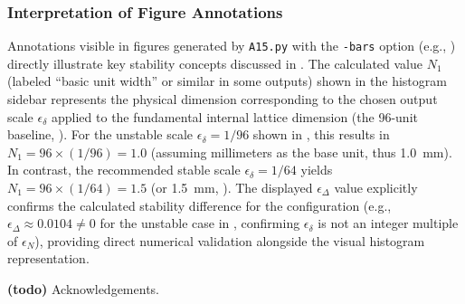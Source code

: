 \documentclass[10pt]{article}
\begin{document}
\subsubsection{Interpretation of Figure Annotations}\label{subsubsec-notes-figures}
Annotations visible in figures generated by \texttt{A15.py} with the \texttt{-bars} option (e.g., ) directly illustrate key stability concepts discussed in . The calculated value $N_1$ (labeled ``basic unit width'' or similar in some outputs) shown in the histogram sidebar represents the physical dimension corresponding to the chosen output scale $\epsilon_\delta$ applied to the fundamental internal lattice dimension (the 96-unit baseline, ). For the unstable scale $\epsilon_\delta=1/96$ shown in , this results in $N_1 = 96 \times (1/96) = 1.0$ (assuming millimeters as the base unit, thus \SI{1.0}{\milli\meter}). In contrast, the recommended stable scale $\epsilon_\delta = 1/64$ yields $N_1 = 96 \times (1/64) = 1.5$ (or \SI{1.5}{\milli\meter}, ). The displayed $\epsilon_\Delta$ value explicitly confirms the calculated stability difference for the configuration (e.g., $\epsilon_\Delta \approx \num{0.0104} \neq 0$ for the unstable case in , confirming $\epsilon_\delta$ is not an integer multiple of $\epsilon_N$), providing direct numerical validation alongside the visual histogram representation.


\begin{acknowledgements}

  \textbf{(todo)} Acknowledgements.

\end{acknowledgements}




\end{document}
